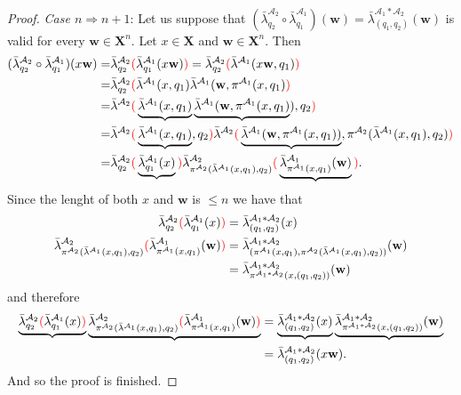 \documentclass[mat1]{fmfdeloTS2.0}
\newcommand{\word}{\mathbf}				%
\newcommand{\abece}{\mathbf{X}}			%
\newcommand{\auto}{\mathcal}			%
\newcommand{\LAMBDA}{\bar{\lambda}}			%
\begin{document}
\begin{proof}
\emph{Case $n\Rightarrow n+1$}: Let us suppose that $ (\LAMBDA^{\auto{A}_2}_{q_2} \circ \LAMBDA^{\auto{A}_1}_{q_1})(\word{w}) = \LAMBDA^{\auto{A}_1*\auto{A}_2}_{(q_1,q_2)}(\word{w})$ is valid for every $\word{w}\in\abece^n$. Let $x\in\abece$ and $\word{w}\in\abece^n$. Then 
\begin{align*}
(\LAMBDA_{q_2}^{\auto{A}_2}\circ\LAMBDA_{q_1}^{\auto{A}_1})(x\word{w})=&
\LAMBDA_{q_2}^{\auto{A}_2}\textcolor{red}{(}\LAMBDA_{q_1}^{\auto{A}_1}(x\word{w})\textcolor{red}{)}=
\LAMBDA_{q_2}^{\auto{A}_2}\textcolor{red}{(}\LAMBDA^{\auto{A}_1}(x\word{w},{q_1})\textcolor{red}{)}\\
=&\LAMBDA_{q_2}^{\auto{A}_2}\textcolor{red}{(}		\LAMBDA^{\auto{A}_1}(x,{q_1}) 	\LAMBDA^{\auto{A}_1}(\word{w},\pi^{\auto{A}_1}(x,{q_1})	\textcolor{red}{)}\\=&
\LAMBDA^{\auto{A}_2}\textcolor{red}{(}	\underbrace{\LAMBDA^{\auto{A}_1}(x,{q_1})} 	\underbrace{\LAMBDA^{\auto{A}_1}(\word{w},\pi^{\auto{A}_1}(x,{q_1})})	,q_2\textcolor{red}{)}\\=&
\LAMBDA^{\auto{A}_2}\textcolor{red}{(}	\underbrace{\LAMBDA^{\auto{A}_1}(x,{q_1})},	q_2\textcolor{red}{)} 	\LAMBDA^{\auto{A}_2}\textcolor{red}{(}\underbrace{\LAMBDA^{\auto{A}_1}(\word{w},\pi^{\auto{A}_1}(x,{q_1}))}	,\pi^{\auto{A}_2}(\LAMBDA^{\auto{A}_1}(x,{q_1}),q_2)\textcolor{red}{)}\\=&
\LAMBDA^{\auto{A}_2}_{q_2}\textcolor{red}{(}	\underbrace{\LAMBDA^{\auto{A}_1}_{q_1}(x)}\textcolor{red}{)} 	\LAMBDA^{\auto{A}_2}_{\pi^{\auto{A}_2}(\LAMBDA^{\auto{A}_1}(x,{q_1}),q_2)}\textcolor{red}{(}\underbrace{\LAMBDA^{\auto{A}_1}_{\pi^{\auto{A}_1}(x,{q_1})}(\word{w})}\textcolor{red}{)}.
\end{align*}
Since the lenght of both $x$ and $\word{w}$ is $\leqslant n$ we have that 
\begin{align*}
\LAMBDA^{\auto{A}_2}_{q_2}\textcolor{red}{(}	\LAMBDA^{\auto{A}_1}_{q_1}(x)\textcolor{red}{)}&=\LAMBDA^{\auto{A}_1*\auto{A}_2}_{(q_1,q_2)}(x)\\
\LAMBDA^{\auto{A}_2}_{\pi^{\auto{A}_2}(\LAMBDA^{\auto{A}_1}(x,{q_1}),q_2)}\textcolor{red}{(}\LAMBDA^{\auto{A}_1}_{\pi^{\auto{A}_1}(x,{q_1})}(\word{w})\textcolor{red}{)}&=\LAMBDA^{\auto{A}_1*\auto{A}_2}_{(\pi^{\auto{A}_1}(x,{q_1}),\pi^{\auto{A}_2}(\LAMBDA^{\auto{A}_1}(x,{q_1}),q_2))}(\word{w})\\&=\LAMBDA^{\auto{A}_1*\auto{A}_2}_{\pi^{\auto{A}_1*\auto{A}_2}(x,{(q_1,q_2)})}(\word{w})
\end{align*} 
and therefore
\begin{align*}
\underbrace{\LAMBDA^{\auto{A}_2}_{q_2}\textcolor{red}{(}	\LAMBDA^{\auto{A}_1}_{q_1}(x)\textcolor{red}{)}} 	\underbrace{\LAMBDA^{\auto{A}_2}_{\pi^{\auto{A}_2}(\LAMBDA^{\auto{A}_1}(x,{q_1}),q_2)}\textcolor{red}{(}\LAMBDA^{\auto{A}_1}_{\pi^{\auto{A}_1}(x,{q_1})}(\word{w})\textcolor{red}{)}}&=
\underbrace{\LAMBDA^{\auto{A}_1*\auto{A}_2}_{(q_1,q_2)}(x)}\underbrace{\LAMBDA^{\auto{A}_1*\auto{A}_2}_{\pi^{\auto{A}_1*\auto{A}_2}(x,{(q_1,q_2)})}(\word{w})}\\&=\LAMBDA^{\auto{A}_1*\auto{A}_2}_{(q_1,q_2)}(x\word{w}).
\end{align*}
And so the proof is finished.
\end{proof}
\end{document}
